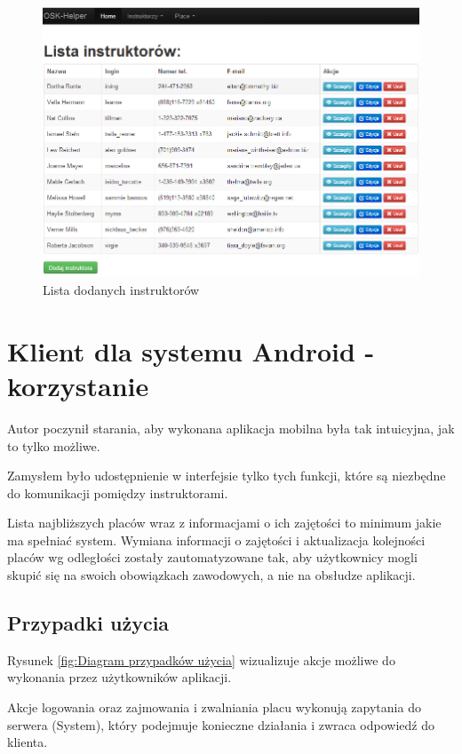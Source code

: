 \documentclass[twoside,a4paper,openright,12pt]{book}
\begin{document}
\begin{figure}[H]
\centering
\includegraphics[width=1\textwidth]{screenshots/panel/lista_instruktorow.png}
\caption{Lista dodanych instruktorów}
\label{fig:Lista_instruktorow}
\end{figure}


\chapter{Klient dla systemu Android - korzystanie}

Autor poczynił starania, aby wykonana aplikacja mobilna była tak intuicyjna, jak to tylko możliwe.

Zamysłem było udostępnienie w interfejsie tylko tych funkcji, które są niezbędne do komunikacji pomiędzy instruktorami.

Lista najbliższych placów wraz z informacjami o ich zajętości to minimum jakie ma spełniać system. Wymiana informacji o zajętości i aktualizacja kolejności placów wg odległości zostały zautomatyzowane tak, aby użytkownicy mogli skupić się na swoich obowiązkach zawodowych, a nie na obsłudze aplikacji.



\section{Przypadki użycia}

Rysunek \ref{fig:Diagram przypadków użycia} wizualizuje akcje możliwe do wykonania przez użytkowników aplikacji.

Akcje logowania oraz zajmowania i zwalniania placu wykonują zapytania do serwera (System), który podejmuje konieczne działania i zwraca odpowiedź do klienta.
\end{document}

